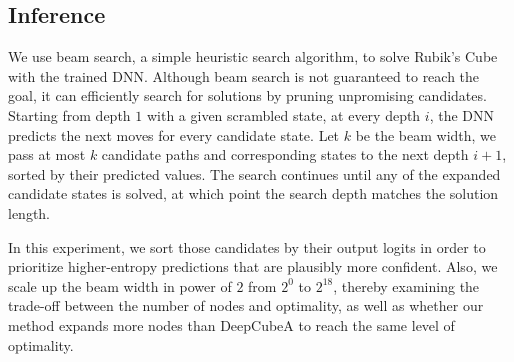 \documentclass[nohyperref]{article}
\theoremstyle{plain}
\theoremstyle{definition}
\theoremstyle{remark}
\begin{document}
\subsection{Inference}
We use beam search, a simple heuristic search algorithm, to solve Rubik's Cube with the trained DNN.
Although beam search is not guaranteed to reach the goal, it can efficiently search for solutions by pruning unpromising candidates.
Starting from depth $1$ with a given scrambled state, at every depth $i$, the DNN predicts the next moves for every candidate state.
Let $k$ be the beam width, we pass at most $k$ candidate paths and corresponding states to the next depth $i+1$, sorted by their predicted values.
The search continues until any of the expanded candidate states is solved, at which point the search depth matches the solution length.

In this experiment, we sort those candidates by their output logits in order to prioritize higher-entropy predictions that are plausibly more confident.
Also, we scale up the beam width in power of $2$ from $2^0$ to $2^{18}$, thereby examining the trade-off between the number of nodes and optimality, as well as whether our method expands more nodes than DeepCubeA to reach the same level of optimality.

\end{document}
